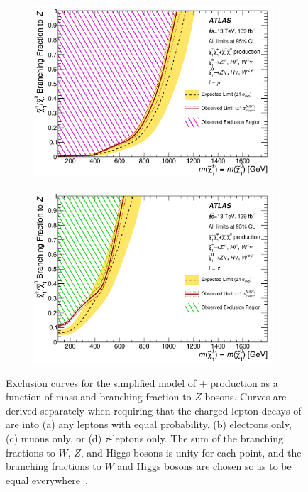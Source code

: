 \begin{figure}
\begin{subfigure}[b]{0.49\textwidth}
      \includegraphics[width=0.98\textwidth]{figs/rpvthreel/contours_bre_0_brm_100_brt_0_Nominal.png}
      \caption{}
      \label{fig:contour_100mu}
    \end{subfigure}
    \begin{subfigure}[b]{0.49\textwidth}
      \centering
      \includegraphics[width=0.98\textwidth]{figs/rpvthreel/contours_bre_0_brm_0_brt_100_Nominal.png}
      \caption{}
      \label{fig:contour_100tau}
    \end{subfigure}
    \caption[Exclusion curves for the simplified model of \CCsignal + \CNsignal production as a function of \chono mass and branching fraction to $Z$ bosons.]{Exclusion curves for the simplified model of \CCsignal + \CNsignal production as a function of \chono mass and branching fraction to $Z$ bosons.
    Curves are derived separately when requiring that the charged-lepton decays of \chono are into (a) any leptons with equal probability, (b) electrons only, (c) muons only, or (d) $\tau$-leptons only.
    \explimit
    \obslimit
    \exludedcolors
    The sum of the \chono branching fractions to $W$, $Z$, and Higgs bosons is unity for each point, and the branching fractions to $W$ and Higgs bosons are chosen so as to be equal everywhere~\cite{ATLAS:2020uer}.}
    \label{fig:contours}
\end{figure}

